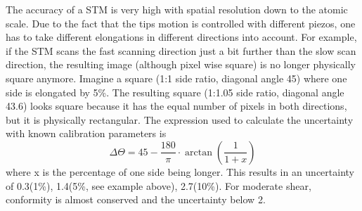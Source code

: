 The accuracy of a STM is very high with spatial resolution down to the atomic scale. Due to the fact that the tips motion is controlled with different piezos, one has to take different elongations in different directions into account. For example, if the STM scans the fast scanning direction just a bit further than the slow scan direction, the resulting image (although pixel wise square) is no longer physically square anymore. Imagine a square (1:1 side ratio, diagonal angle 45\textdegree) where one side is elongated by 5\%. The resulting square (1:1.05 side ratio, diagonal angle 43.6\textdegree) looks square because it has the equal number of pixels in both directions, but it is physically rectangular. The expression used to calculate the uncertainty with known calibration parameters is
$$\Delta \Theta = 45 - \frac{180}{\pi}\cdot\arctan(\frac{1}{1+x})$$ where x is the percentage of one side being longer. This results in an uncertainty of 0.3\textdegree(1\%), 1.4\textdegree(5\%, see example above), 2.7\textdegree(10\%). For moderate shear, conformity is almost conserved and the uncertainty below 2\textdegree.